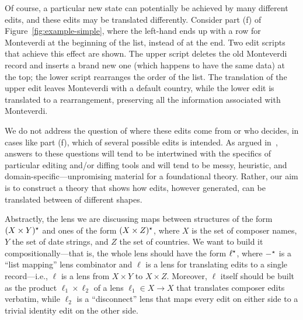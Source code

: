 Of course, a particular new \replica state can potentially be achieved by
many different edits, and these edits may be translated differently.
Consider part (f) of Figure~\ref{fig:example-simple}, where the left-hand
\replica ends up with a row for {\sf Monteverdi} at the beginning of the
list, instead of at the end. Two edit scripts that achieve this effect are
shown. The upper script deletes the old {\sf Monteverdi} record and inserts
a brand new one (which happens to have the same data) at the top; the lower
script rearranges the order of the list. The translation of the upper edit
leaves {\sf Monteverdi} with a default country, while the lower edit is
translated to a rearrangement, preserving all the information associated
with {\sf Monteverdi}.

We do not address the question of where these edits come from or who
decides, in cases like part (f), which of several possible edits is
intended.  As argued in~\cite{Matching10}, answers to these questions will
tend to be intertwined with the specifics of particular editing and/or
diffing tools and will tend to be messy, heuristic, and
domain-specific---unpromising material for a foundational theory.  Rather,
our aim is to construct a theory that shows how edits, however
generated, can be translated between \replicas of different shapes.

\iflater{}\fi

Abstractly, the lens we are discussing maps between structures of the form
$(X \times Y)^\star$ and ones of the form $(X \times Z)^\star$, where $X$ is the set
of composer names, $Y$ the set of date strings, and $Z$ the set of
countries.  We want to build it compositionally---that is, the whole lens
should have the form $\ell^\star$, where $-^\star$ is a ``list mapping'' lens
combinator and $\ell$ is a lens for translating edits to a
single record---i.e., $\ell$ is a lens from $X \times Y$ to $X \times Z$.
Moreover, $\ell$ itself should be built as the product $\ell_1 \times
\ell_2$ of a lens $\ell_1 \in X \to X$ that translates composer edits
verbatim, while $\ell_2$ is a ``disconnect'' lens that maps every edit on
either side to a trivial identity edit on the other side.


